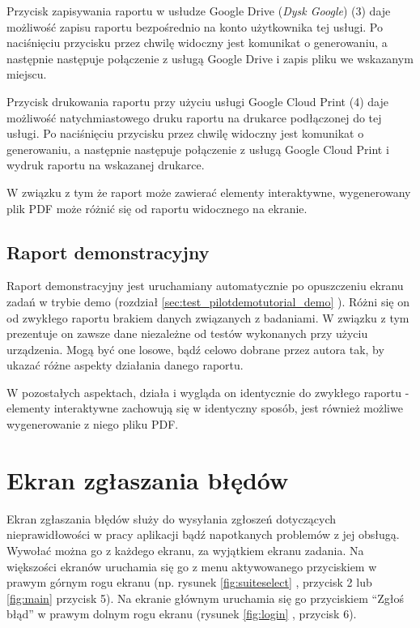 \documentclass[a4paper,10pt,twosided]{book}
\newcommand{\refwithpage}[3]{
\ref{#1}\ifthenelse{\equal{\thepage}{\pageref{#1}}}{}{#2\pageref{#1}#3}%
}
\newcommand{\ppref}[1]{\refwithpage{#1}{ -- strona }{}}
\begin{document}
Przycisk zapisywania raportu w usłudze Google Drive (\emph{Dysk Google}) (3) daje możliwość zapisu raportu bezpośrednio na konto użytkownika tej usługi. Po naciśnięciu przycisku przez chwilę widoczny jest komunikat o generowaniu, a następnie następuje połączenie z usługą Google Drive i zapis pliku we wskazanym miejscu.

Przycisk drukowania raportu przy użyciu usługi Google Cloud Print (4) daje możliwość natychmiastowego druku raportu na drukarce podłączonej do tej usługi. Po naciśnięciu przycisku przez chwilę widoczny jest komunikat o generowaniu, a następnie następuje połączenie z usługą Google Cloud Print i wydruk raportu na wskazanej drukarce.

W związku z tym że raport może zawierać elementy interaktywne, wygenerowany plik PDF może różnić się od raportu widocznego na ekranie.


\section{Raport demonstracyjny}
\label{sec:report_demo}

Raport demonstracyjny jest uruchamiany automatycznie po opuszczeniu ekranu zadań w trybie demo (rozdział \ppref{sec:test_pilotdemotutorial_demo}). Różni się on od zwykłego raportu brakiem danych związanych z badaniami. W związku z tym prezentuje on zawsze dane  niezależne od testów wykonanych przy użyciu urządzenia. Mogą być one losowe, bądź celowo dobrane przez autora tak, by ukazać różne aspekty działania danego raportu.

W pozostałych aspektach, działa i wygląda on identycznie do zwykłego raportu - elementy interaktywne zachowują się w identyczny sposób, jest również możliwe wygenerowanie z niego pliku PDF.


\chapter{Ekran zgłaszania błędów}
\label{chap:bug_report}

Ekran zgłaszania błędów służy do wysyłania zgłoszeń dotyczących nieprawidłowości w pracy aplikacji bądź napotkanych problemów z jej obsługą. Wywołać można go z każdego ekranu, za wyjątkiem ekranu zadania. Na większości ekranów uruchamia się go z menu aktywowanego przyciskiem w prawym górnym rogu ekranu (np. rysunek \ppref{fig:suiteselect}, przycisk 2 lub \ppref{fig:main} przycisk 5). Na ekranie głównym uruchamia się go przyciskiem ``Zgłoś błąd'' w prawym dolnym rogu ekranu (rysunek \ppref{fig:login}, przycisk 6).
\end{document}
